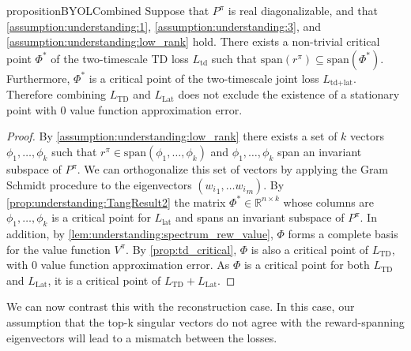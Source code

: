 \begin{restatable}{proposition}{BYOLCombined}\label{prop:understanding:BYOLCombined}
    Suppose that $P^\pi$ is real diagonalizable, and that \autoref{assumption:understanding:1}, \autoref{assumption:understanding:3}, and \autoref{assumption:understanding:low_rank} hold. 
    There exists a non-trivial critical point $\Phi^*$ of the two-timescale TD loss $L_\text{td}$ such that $\mathrm{span}(r^\pi)\subseteq \mathrm{span}(\Phi^*)$. 
    Furthermore, $\Phi^*$ is a critical point of the two-timescale joint loss $L_{\text{td}+\text{lat}}$. Therefore combining $L_\text{TD}$ and $L_\text{Lat}$ does not exclude the existence of a stationary point with $0$ value function approximation error.
\end{restatable}
\begin{proof}
        By \autoref{assumption:understanding:low_rank} there exists a set of $k$ vectors $\phi_1,\allowbreak \dots, \allowbreak \phi_k$ such that $r^\pi \in \text{span}(\phi_1,\allowbreak\dots,\allowbreak\phi_k)$ and $\phi_1,\dots,\phi_k$ span an invariant subspace of $P^\pi$.
        We can orthogonalize this set of vectors by applying the Gram Schmidt procedure to the eigenvectors $({w_i}_1,\dots{w_i}_m)$. 
        By \autoref{prop:understanding:TangResult2} the matrix $\Phi^*\in \mathbb{R}^{n\times k}$ whose columns are $\phi_1,\dots,\phi_k$ is a critical point for $L_\text{lat}$ and spans an invariant subspace of $P^\pi$.
        In addition, by \autoref{lem:understanding:spectrum_rew_value}, $\Phi$ forms a complete basis for the value function $V^\pi$.
        By \autoref{prop:td_critical}, $\Phi$ is also a critical point of $L_\text{TD}$, with $0$ value function approximation error. 
        As $\Phi$ is a critical point for both $L_\text{TD}$ and $L_\text{Lat}$, it is a critical point of $L_\text{TD} + L_\text{Lat}$.
\end{proof}


We can now contrast this with the reconstruction case.
In this case, our assumption that the top-k singular vectors do not agree with the reward-spanning eigenvectors will lead to a mismatch between the losses.


